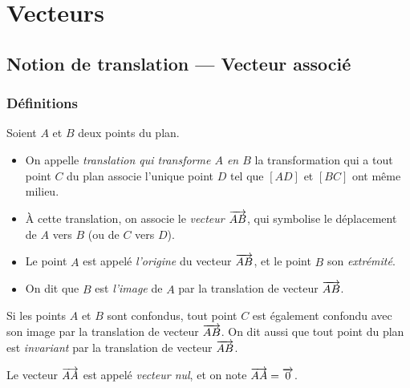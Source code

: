\chapter{Vecteurs}
\section{Notion de translation --- Vecteur associé}

\subsection{Définitions}

\begin{definition}
  Soient $A$ et $B$ deux points du plan.
  \begin{itemize}
    \item On appelle \emph{translation qui transforme $A$ en $B$} la transformation qui a tout point $C$ du plan associe l'unique point $D$ tel que $[AD]$ et $[BC]$ ont même milieu.
    \item À cette translation, on associe le \emph{vecteur $\overrightarrow{AB}$}, qui symbolise le déplacement de $A$ vers $B$ (ou de $C$ vers $D$).
    \item Le point $A$ est appelé \emph{l'origine} du vecteur $\overrightarrow{AB}$, et le point $B$ son \emph{extrémité}.
    \item On dit que $B$ est \emph{l'image} de $A$ par la translation de vecteur $\overrightarrow{AB}$.
  \end{itemize}
\end{definition}

\begin{remarque}
  Si les points $A$ et $B$ sont confondus, tout point $C$ est également confondu avec son image par la translation de vecteur $\overrightarrow{AB}$. On dit aussi que tout point du plan est \emph{invariant} par la translation de vecteur $\overrightarrow{AB}$.

  Le vecteur $\overrightarrow{AA}$ est appelé \emph{vecteur nul}, et on note $\overrightarrow{AA}=\overrightarrow{0}$.
\end{remarque}


